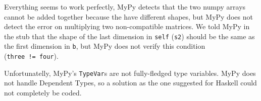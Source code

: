 \begin{Shaded}
\begin{Highlighting}[]

\OperatorTok{=}\NormalTok{ Tuple[}\NormalTok{]}
\OperatorTok{=}\NormalTok{ Tuple[}\NormalTok{, }\NormalTok{]}
\OperatorTok{=}\NormalTok{ Tuple[}\NormalTok{, }\NormalTok{, }\NormalTok{]}
\OperatorTok{=}\NormalTok{ Tuple[}\NormalTok{, }\NormalTok{, }\NormalTok{, }\NormalTok{]}

\OperatorTok{=}\NormalTok{ np.array([[}\NormalTok{, }\NormalTok{, }\NormalTok{], [}\NormalTok{, }\NormalTok{, }\NormalTok{]])  }

\OperatorTok{=}\NormalTok{ np.array([[}\NormalTok{], [}\NormalTok{], [}\NormalTok{], [}\NormalTok{]])    }

\OperatorTok{=}\OperatorTok{+}

\OperatorTok{=}
\end{Highlighting}
\end{Shaded}

Everything seems to work perfectly, MyPy detects that the two numpy
arrays cannot be added together because the have different shapes, but
MyPy does not detect the error on multiplying two non-compatible
matrices. We told MyPy in the stub that the shape of the last dimension
in \texttt{self} (\texttt{s2}) should be the same as the first dimension
in \texttt{b}, but MyPy does not verify this condition
(\texttt{three\ !=\ four}).

Unfortunatelly, MyPy's \texttt{TypeVar}s are not fully-fledged type
variables. MyPy does not handle Dependent Types, so a solution as the
one suggested for Haskell could not completely be coded.

